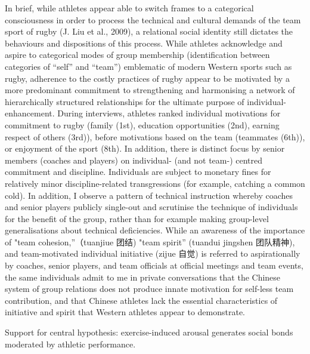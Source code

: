 \documentclass[12pt]{report}
\begin{document}
In brief, while athletes appear able to switch frames to a categorical consciousness in order to process the technical and cultural demands of the team sport of rugby (J. Liu et al., 2009), a relational social identity still dictates the behaviours and dispositions of this process.  While athletes acknowledge and aspire to categorical modes of group membership (identification between categories of “self” and “team”) emblematic of modern Western sports such as rugby, adherence to the costly practices of rugby appear to be motivated by a more predominant commitment to strengthening and harmonising a network of hierarchically structured relationships for the ultimate purpose of individual-enhancement.  During interviews, athletes ranked individual motivations for commitment to rugby (family (1st), education opportunities (2nd), earning respect of others (3rd)), before motivations based on the team (teammates (6th)), or enjoyment of the sport (8th).  In addition, there is distinct focus by senior members (coaches and players) on individual- (and not team-) centred commitment and discipline.  Individuals are subject to monetary fines for relatively minor discipline-related transgressions (for example, catching a common cold). In addition, I observe a pattern of technical instruction whereby coaches and senior players publicly single-out and scrutinise the technique of individuals for the benefit of the group, rather than for example making group-level generalisations about technical deficiencies.   While an awareness of the importance of "team cohesion,”（tuanjiue 团结) "team spirit” (tuandui jingshen 团队精神), and team-motivated individual initiative (zijue 自觉) is referred to aspirationally by coaches, senior players, and team officials at official meetings and team events, the same individuals admit to me in private conversations that the Chinese system of group relations does not produce innate motivation for self-less team contribution, and that Chinese athletes lack the essential characteristics of initiative and spirit that Western athletes appear to demonstrate.


Support for central hypothesis: exercise-induced arousal generates social bonds moderated by athletic performance.
\end{document}
